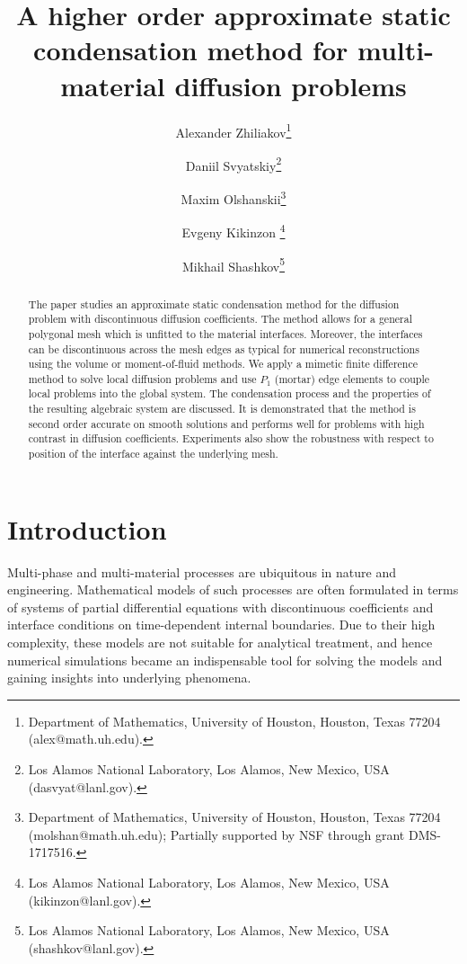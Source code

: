 \documentclass[12pt]{article}
\title{A higher order approximate static condensation method for multi-material diffusion problems}
\author{
	Alexander Zhiliakov\thanks{Department of Mathematics, University of Houston, Houston, Texas 77204 (alex@math.uh.edu).}
	\and Daniil Svyatskiy\thanks{Los Alamos National Laboratory, Los Alamos,
		New Mexico, USA (dasvyat@lanl.gov).}
	\and
	Maxim Olshanskii\thanks{Department of Mathematics, University of Houston, Houston, Texas 77204 (molshan@math.uh.edu); Partially supported by NSF through grant  DMS-1717516.}
	\and Evgeny Kikinzon \thanks{Los Alamos National Laboratory, Los Alamos,
		New Mexico, USA (kikinzon@lanl.gov).}
	\and Mikhail Shashkov\thanks{Los Alamos National Laboratory, Los Alamos,
		New Mexico, USA (shashkov@lanl.gov).}
}
\newcommand{\Sasha}[1]{\colorbox{Cyan}{\textbf{Sasha}:} #1}
\begin{document}
	
	\maketitle
	
	\let\oldtabular\tabular
	\renewcommand{\tabular}[1][1.5]{\def\arraystretch{#1}\oldtabular}
	
	
	\begin{abstract}
		The paper studies an approximate static condensation method for the diffusion problem with discontinuous diffusion coefficients. The method allows for a general polygonal mesh which is unfitted to the material interfaces. Moreover, the interfaces can be discontinuous across the mesh edges as typical for numerical reconstructions using the volume or moment-of-fluid methods.  We apply a mimetic finite difference method to solve local diffusion problems and use $P_1$ (mortar) edge elements to couple local problems into the global system. The condensation process and the properties of the resulting algebraic system are discussed. It is demonstrated that the method is second order accurate on smooth solutions and performs well for problems with high contrast in diffusion coefficients. Experiments also show the robustness with respect to position of the interface against the underlying mesh.
	\end{abstract}
	
	
	\section{Introduction}
	
	Multi-phase and multi-material processes are ubiquitous in nature and engineering.
	Mathematical models of such processes are often formulated in terms of systems of partial differential equations with discontinuous coefficients and interface conditions on time-dependent internal boundaries.
	Due to their high complexity, these models are not suitable for analytical treatment, and hence numerical simulations became an indispensable tool for solving the models and gaining insights into underlying phenomena.
	
\end{document}
